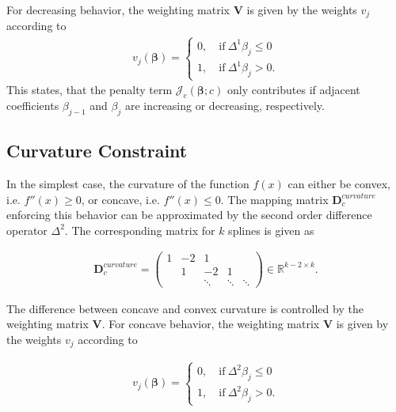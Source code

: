 \documentclass[10pt,a4paper]{article}
\begin{document}
	For decreasing behavior, the weighting matrix $\boldsymbol{V}$ is given by the weights $v_j$ according to
	\begin{align} \label{eq:v_monoton_dec}
		v_j(\boldsymbol{\beta}) = \begin{cases} 0, \quad \text{if} \ \Delta^1\beta_j \le 0 \\ 
						    					1, \quad \text{if} \ \Delta^1\beta_j > 0.
			\end{cases}	
	\end{align}
	This states, that the penalty term $\mathcal{J}_c(\boldsymbol{\beta}; c)$ only contributes if adjacent coefficients $\beta_{j-1}$ and $\beta_j$ are increasing or decreasing, respectively. \cite{hofner2011monotonicity} \cite{eilers2005unimodal}

	\subsection{Curvature Constraint}
	
	In the simplest case, the curvature of the function $f(x)$ can either be convex, i.e. $f''(x) \ge 0$, or concave, i.e. $f''(x) \le 0$. The mapping matrix $\boldsymbol{D}_c^{curvature}$ enforcing this behavior can be approximated by the second order difference operator $\Delta^2$. The corresponding matrix for $k$ splines is given as

	\begin{align} \label{eq:D_c_curvature}
		\boldsymbol{D}_c^{curvature} = \begin{pmatrix} 1 & -2 & 1 		&  		 & \\ 
														 & 1  &-2 	    &1 		 & \\
														 & 	  & \ddots  & \ddots & \ddots  
										\end{pmatrix} \in \mathbb{R}^{k-2 \times k}.
	\end{align}	
	
	The difference between concave and convex curvature is controlled by the weighting matrix $\boldsymbol{V}$. For concave behavior, the weighting matrix $\boldsymbol{V}$ is given by the weights $v_j$ according to
	
	\begin{align}\label{eq:v_curvature_concave}
		v_j(\boldsymbol{\beta}) = \begin{cases} 
										0, \quad \text{if} \ \Delta^2\beta_j \le 0 \\ 
										1, \quad \text{if} \ \Delta^2\beta_j > 0. 
								   \end{cases}
	\end{align}
	
\end{document}
